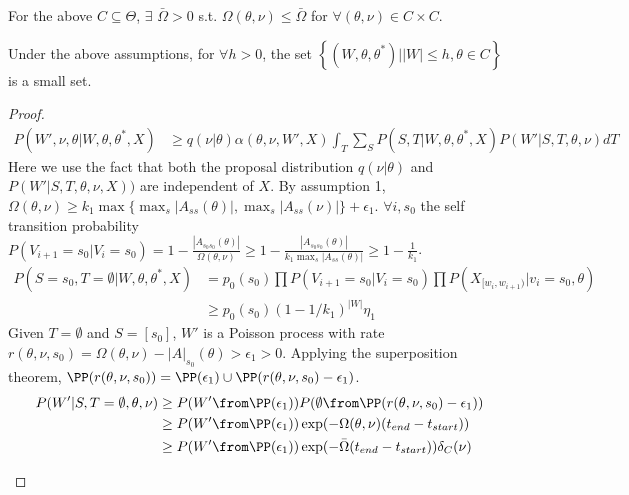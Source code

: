 \begin{assumption}
For the above $C \subseteq \Theta$, $\exists$ $\bar{\Omega} > 0$ s.t. $\Omega(\theta, \nu)  \leq \bar{\Omega}$ for $\forall (\theta, \nu) \in C \times C$.
\end{assumption}


\begin{theorem}
Under the above assumptions, for $\forall h > 0$, the set $\left\lbrace (W, \theta, \theta^*) | |W| \leq h, \theta \in C \right\rbrace$ is a small set.
\end{theorem}
\begin{proof}
\begin{align*}
P(W', \nu, \theta | W, \theta, \theta^*,X) &\geq q(\nu | \theta)
         \alpha(\theta, \nu, W',X) \int_T \sum_S P(S,T | W, \theta, \theta^*, X) P(W'| S, T, \theta, \nu)dT  
\end{align*}
Here we use the fact that both the proposal distribution $q(\nu|\theta)$
and $P(W'|S,T,\theta,\nu,X))$ are independent of  $X$.
By assumption 1,  $\Omega(\theta, \nu) \geq k_1 \max\{ \max_s|A_{ss}(\theta)|, \max_s|A_{ss}(\nu)|\} + \epsilon_1 $. $\forall i, s_0$ the self transition probability $P(V_{i + 1} = s_0 | V_i = s_0) = 1 - \frac{|A_{s_0s_0}(\theta)|}{\Omega(\theta, \nu)} \geq 1 - \frac{|A_{s_0s_0}(\theta)|}{k_1 \max_s|A_{ss}(\theta)|} \geq 1 - \frac{1}{k_1}$.
\begin{align*}
P(S=s_0, T = \emptyset | W, \theta, \theta^*, X) & = p_0(s_0)\prod P(V_{i + 1} = s_0 | V_i = s_0) \prod P(X_{[w_i, w_{i + 1})} | v_i = s_0, \theta)\\
& \geq p_0(s_0)(1 - 1/k_1)^{|W|}\eta_1
\end{align*}
Given $T = \emptyset$ and $S = [s_0]$, $W'$ is a Poisson process with rate 
$r(\theta, \nu, s_0) = \Omega(\theta, \nu) - |A|_{s_0}(\theta) > \epsilon_1 > 0$. 
Applying the superposition theorem, $\PP(r(\theta, \nu, s_0)) =
\PP(\epsilon_1) \cup \PP(r(\theta, \nu, s_0) - \epsilon_1)$.
\begin{align*}
P(W' | S, T = \emptyset, \theta, \nu) & \geq P(W' \from \PP(\epsilon_1))
P(\emptyset \from \PP(r(\theta, \nu, s_0) - \epsilon_1))\\
& \geq P(W' \from \PP(\epsilon_1)) \exp(-\Omega(\theta, \nu)(t_{end} - t_{start}))\\
& \geq P(W' \from \PP(\epsilon_1)) \exp(-\bar{\Omega}(t_{end} - t_{start}))\delta_C(\nu)
\end{align*}
\begin{align*}

\end{align*}
\end{proof}
